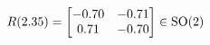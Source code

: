 \documentclass[preview]{standalone}
\begin{document}
\begin{align*}
\special{dvisvgm:raw <g id='unique000'>}R(2.35) = \begin{bmatrix} -0.70 & -0.71 \\ 0.71 & -0.70 \end{bmatrix} \in \text{SO}(2)\special{dvisvgm:raw </g>}
\end{align*}
\end{document}
